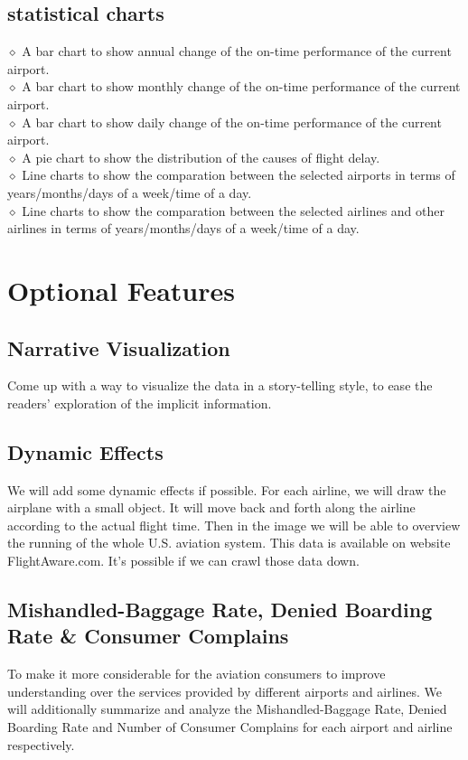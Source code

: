 \documentclass[12pt]{article}
\begin{document}
    \subsection{statistical charts}
    \noindent $\diamond$ A bar chart to show annual change of the on-time performance of the current airport.\\
    $\diamond$ A bar chart to show monthly change of the on-time performance of the current airport.\\
    $\diamond$ A bar chart to show daily change of the on-time performance of the current airport.\\
    $\diamond$ A pie chart to show the distribution of the causes of flight delay.\\
    $\diamond$ Line charts to show the comparation between the selected airports in terms of years/months/days of a week/time of a day.\\
    $\diamond$ Line charts to show the comparation between the selected airlines and other airlines in terms of years/months/days of a week/time of a day.\\

\section{Optional Features}
    \subsection{Narrative Visualization}
    Come up with a way to visualize the data in a story-telling style, to ease the readers' exploration of the implicit information.
    \subsection{Dynamic Effects}
    We will add some dynamic effects if possible. For each airline, we will draw the airplane with a small object. It will move back and forth along the airline according to the actual flight time. Then in the image we will be able to overview the running of the whole U.S. aviation system.
    This data is available on website FlightAware.com. It's possible if we can crawl those data down.
    \subsection{Mishandled-Baggage Rate, Denied Boarding Rate \& Consumer Complains}
    To make it more considerable for the aviation consumers to improve understanding over the services provided by different airports and airlines. We will additionally summarize and analyze the Mishandled-Baggage Rate, Denied Boarding Rate and Number of Consumer Complains for each airport and airline respectively.
\end{document}
